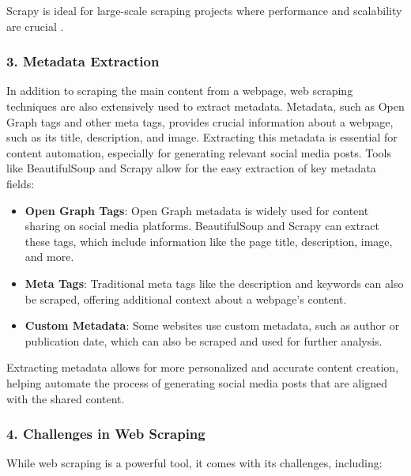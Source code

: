 Scrapy is ideal for large-scale scraping projects where performance and scalability are crucial \cite{scrapy_documentation}.

\subsubsection{3. Metadata Extraction}

In addition to scraping the main content from a webpage, web scraping techniques are also extensively used to extract metadata. Metadata, such as Open Graph tags and other meta tags, provides crucial information about a webpage, such as its title, description, and image. Extracting this metadata is essential for content automation, especially for generating relevant social media posts. Tools like BeautifulSoup and Scrapy allow for the easy extraction of key metadata fields:

\begin{itemize}
    \item \textbf{Open Graph Tags}: Open Graph metadata is widely used for content sharing on social media platforms. BeautifulSoup and Scrapy can extract these tags, which include information like the page title, description, image, and more.
    \item \textbf{Meta Tags}: Traditional meta tags like the description and keywords can also be scraped, offering additional context about a webpage's content.
    \item \textbf{Custom Metadata}: Some websites use custom metadata, such as author or publication date, which can also be scraped and used for further analysis.
\end{itemize}

Extracting metadata allows for more personalized and accurate content creation, helping automate the process of generating social media posts that are aligned with the shared content.

\subsubsection{4. Challenges in Web Scraping}

While web scraping is a powerful tool, it comes with its challenges, including:

